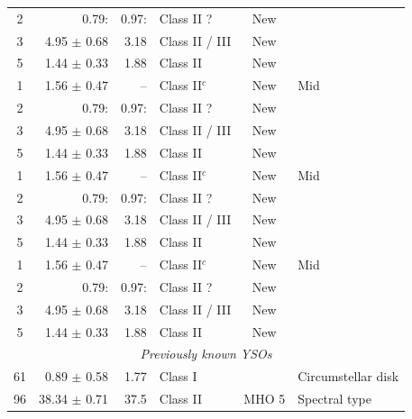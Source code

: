 \documentclass{aa}
\begin{document}
\begin{appendix}
\begin{table}[ht!]
\begin{tabular}{crrlcl}
			2         & 0.79:            & 0.97:               & Class II ?     & New            &                    \\
			3         & 4.95 $\pm$ 0.68  & 3.18                & Class II / III & New            &                    \\
			5         & 1.44 $\pm$ 0.33  & 1.88                & Class II       & New            &                    \\
			1         & 1.56 $\pm$ 0.47  & --                  & Class II$^{c}$ & New            & Mid                \\
			2         & 0.79:            & 0.97:               & Class II ?     & New            &                    \\
			3         & 4.95 $\pm$ 0.68  & 3.18                & Class II / III & New            &                    \\
			5         & 1.44 $\pm$ 0.33  & 1.88                & Class II       & New            &                    \\
			1         & 1.56 $\pm$ 0.47  & --                  & Class II$^{c}$ & New            & Mid                \\
			2         & 0.79:            & 0.97:               & Class II ?     & New            &                    \\
			3         & 4.95 $\pm$ 0.68  & 3.18                & Class II / III & New            &                    \\
			5         & 1.44 $\pm$ 0.33  & 1.88                & Class II       & New            &                    \\
			1         & 1.56 $\pm$ 0.47  & --                  & Class II$^{c}$ & New            & Mid                \\
			2         & 0.79:            & 0.97:               & Class II ?     & New            &                    \\
			3         & 4.95 $\pm$ 0.68  & 3.18                & Class II / III & New            &                    \\
			5         & 1.44 $\pm$ 0.33  & 1.88                & Class II       & New            &                    \\
			\hline
			\multicolumn{6}{c}{\it Previously known YSOs}                                                             \\
			\hline
			61        & 0.89 $\pm$ 0.58  & 1.77                & Class I        & \object{HH 30} & Circumstellar disk \\
			96        & 38.34 $\pm$ 0.71 & 37.5                & Class II       & MHO 5          & Spectral type      \\
			\hline
		\end{tabular}
	\end{table}



\end{appendix}
\end{document}
